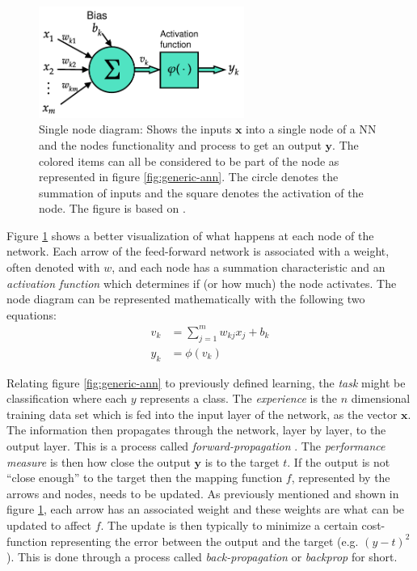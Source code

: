 \documentclass[../main.tex]{subfiles}
\begin{document}
\begin{figure}[ht!]
    \centering
    \includegraphics[width=0.6\textwidth]{img/node-diagram}
    \caption{Single node diagram: Shows the inputs $\mathbf{x}$ into a single node of a \ac{NN} and the nodes functionality and process to get an output $\mathbf{y}$. The colored items can all be considered to be part of the node as represented in figure \ref{fig:generic-ann}. The circle denotes the summation of inputs and the square denotes the activation of the node. The figure is based on \cite[Fig. 5]{Haykin2009}.}
    \label{fig:node-diagram}
\end{figure}

Figure \ref{fig:node-diagram} shows a better visualization of what happens at each node of the network.
Each arrow of the feed-forward network is associated with a weight, often denoted with $w$, and each node has a summation characteristic and an \textit{activation function} which determines if (or how much) the node activates.
The node diagram can be represented mathematically with the following two equations:
\begin{subequations}
\label{eq:ann-node}
\begin{align}
    v_k &= \sum_{j=1}^m w_{kj}x_j + b_k \\
    y_k &= \phi (v_k)
\end{align}
\end{subequations}


Relating figure \ref{fig:generic-ann} to previously defined learning, the \textit{task} might be classification where each $y$ represents a class.
The \textit{experience} is the $n$ dimensional training data set which is fed into the input layer of the network, as the vector $\mathbf{x}$.
The information then propagates through the network, layer by layer, to the output layer. 
This is a process called \textit{forward-propagation} \cite{Goodfellow2016}.
The \textit{performance measure} is then how close the output $\mathbf{y}$ is to the target $t$.
If the output is not ``close enough'' to the target then the mapping function $f$, represented by the arrows and nodes, needs to be updated.
As previously mentioned and shown in figure \ref{fig:node-diagram}, each arrow has an associated weight and these weights are what can be updated to affect $f$.
The update is then typically to minimize a certain cost-function representing the error between the output and the target (e.g. $(y-t)^2$).
This is done through a process called \textit{back-propagation} or \textit{backprop} for short.
\end{document}
